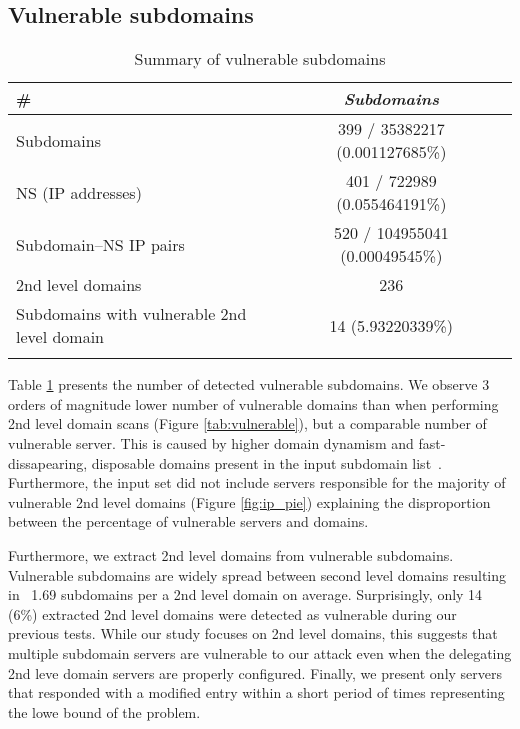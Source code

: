 \subsection{Vulnerable subdomains}

\begin{table}
  \caption{Summary of vulnerable subdomains \label{tab:subdomains}}
 \centering
\begin{tabular}{l*{2}{c}}
\Xhline{2\arrayrulewidth}
\#  & \textbf{\textit{Subdomains}}  \\
\hline
Subdomains & 399 / 35382217 (0.001127685\%) \\
NS (IP addresses) & 401 / 722989 (0.055464191\%)  \\
Subdomain--NS IP pairs & 520 / 104955041 (0.00049545\%)  \\
\hline
2nd level domains & 236 \\
Subdomains with vulnerable 2nd level domain &  14 (5.93220339\%) \\
\Xhline{2\arrayrulewidth}
 \end{tabular}
\end{table}

Table \ref{tab:subdomains} presents the number of detected vulnerable subdomains. We observe 3 orders of magnitude lower number of vulnerable domains than when performing 2nd level domain scans (Figure \ref{tab:vulnerable}), but a comparable number of vulnerable server. This is caused by higher domain dynamism and fast-dissapearing, disposable domains present in the input subdomain list~\cite{chen2014dns}. Furthermore, the input set did not include servers responsible for the majority of vulnerable 2nd level domains (Figure \ref{fig:ip_pie}) explaining the disproportion between the percentage of vulnerable servers and domains. 

Furthermore, we extract 2nd level domains from vulnerable subdomains. Vulnerable subdomains are widely spread between second level domains resulting in ~1.69 subdomains per a 2nd level domain on average. Surprisingly, only 14 (6\%) extracted 2nd level domains were detected as vulnerable during our previous tests. While our study focuses on 2nd level domains, this suggests that multiple subdomain servers are vulnerable to our attack even when the delegating 2nd leve domain servers are properly configured. Finally, we present only servers that responded with a modified entry within a short period of times representing the lowe bound of the problem. 


